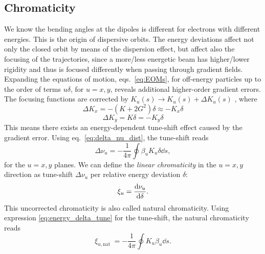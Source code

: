 \subsection{Chromaticity}
We know the bending angles at the dipoles is different for electrons with different energies. This is the origin of dispersive orbits. The energy deviations affect not only the closed orbit by means of the dispersion effect, but affect also the focusing of the trajectories, since a more/less energetic beam has higher/lower rigidity and thus is focused differently when passing through gradient fields.
%
Expanding the equations of motion, eqs.~\eqref{eq:EOMs}, for off-energy particles up to the order of terms $u\delta$, for $u=x,y$, reveals additional higher-order gradient errors. The focusing functions are corrected by $K_u(s)\to K_u(s) + \Delta K_u(s)$ \cite{lee_accelerator_2004,huang_beam-based_2019}, where
\begin{equation}
    \Delta K_x = -(K+2G^2)\delta \approx - K_x\delta
\end{equation}
\begin{equation}
    \Delta K_y = K\delta = - K_y\delta
\end{equation}
This means there exists an energy-dependent tune-shift effect caused by the gradient error. Using eq.~\eqref{eq:delta_nu_dist}, the tune-shift reads
\begin{equation}
    \Delta \nu_u = - \frac{1}{4\pi}\oint\beta_u K_u \delta \dd{s},
    \label{eq:energy_delta_tune}
\end{equation}
for the $u=x,y$ planes. We can define the \textit{linear chromaticity} in the $u=x,y$ direction as tune-shift $\Delta \nu_u$ per relative energy deviation $\delta$:
\begin{equation}
    \xi_u=\dv{\nu_u}{\delta}.
\end{equation}
This uncorrected chromaticity is also called natural chromaticity. Using expression \eqref{eq:energy_delta_tune} for the tune-shift, the natural chromaticity reads
\begin{equation}
\xi_{u, \text {nat }} =-\frac{1}{4 \pi} \oint K_u \beta_u \dd{s}.
\end{equation}

